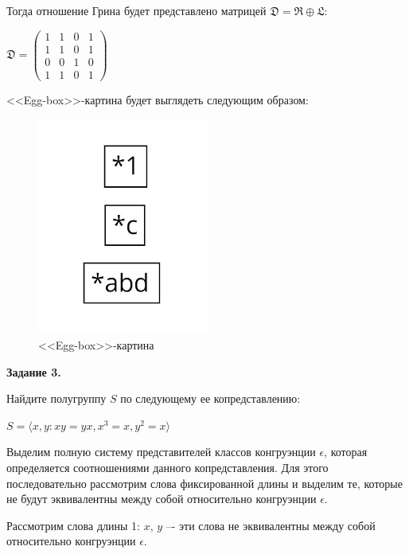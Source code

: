 \documentclass[bachelor, och, labwork]{shiza}
\begin{document}
    Тогда отношение Грина будет представлено матрицей $\mathfrak{D} = \mathfrak{R} \oplus \mathfrak{L}$:

    \begin{center}
      $\mathfrak{D} =
      \begin{pmatrix}
        1 & 1 & 0 & 1 \\
        1 & 1 & 0 & 1 \\
        0 & 0 & 1 & 0 \\
        1 & 1 & 0 & 1
      \end{pmatrix}$
    \end{center}

    <<Egg-box>>-картина будет выглядеть следующим образом:

      \begin{figure}[H]
        \centering
        \includegraphics[width=0.5\textwidth]{photo/egg-box1.png}
        \caption{<<Egg-box>>-картина}
      \end{figure}

      
    \textbf{Задание 3.}
    
    Найдите полугруппу $S$ по следующему ее копредставлению:
    \begin{center}

      $S = \langle x,y : xy = yx, x^3 = x, y^2 = x \rangle$
    \end{center}

    Выделим полную систему представителей классов конгруэнции $\epsilon$, которая определяется соотношениями данного
    копредставления. Для этого последовательно рассмотрим слова фиксированной длины и
    выделим те, которые не будут эквивалентны между собой относительно конгруэнции $\epsilon$.

    Рассмотрим слова длины 1: $x$, $y$ –- эти слова не эквивалентны между собой относительно конгруэнции $\epsilon$.
\end{document}
